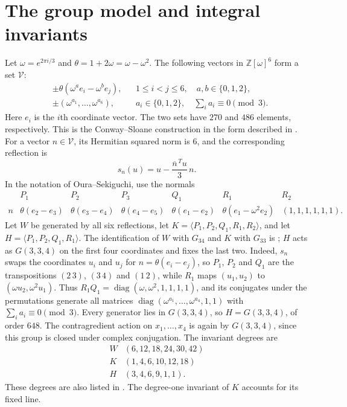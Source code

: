 \documentclass[11pt]{article}
\theoremstyle{definition}
\newcommand{\Z}{\mathbb Z}
\begin{document}
\section{The group model and integral invariants}\label{sec:model}
Let $\omega=e^{2\pi i/3}$ and
$\theta=1+2\omega=\omega-\omega^2$. The following vectors in
$\Z[\omega]^6$ form a set $\mathcal V$:
\begin{align*}
 &\pm\theta(\omega^a e_i-\omega^b e_j),
       &&1\leq i<j\leq6,\quad a,b\in\{0,1,2\},\\
 &\pm(\omega^{a_1},\ldots,\omega^{a_6}),
       &&a_i\in\{0,1,2\},\quad \sum_i a_i\equiv0\pmod3.
\end{align*}
Here $e_i$ is the $i$th coordinate vector. The two sets have $270$ and
$486$ elements, respectively. This is the Conway--Sloane construction
\cite[Theorem~10]{CS} in the form described in \cite[\S2]{OS}.
For a vector $n\in\mathcal V$, its Hermitian squared norm is $6$,
and the corresponding reflection is
\[
                   s_n(u)=u-\frac{\overline n^{\,T}u}{3}\,n.
\]
In the notation of Oura--Sekiguchi, use the normals
\[
\begin{array}{c|cccccc}
 &P_1&P_2&P_3&Q_1&R_1&R_2\\ \hline
n&\theta(e_2-e_3)&\theta(e_3-e_4)&\theta(e_4-e_5)&
\theta(e_1-e_2)&\theta(e_1-\omega^2e_2)&(1,1,1,1,1,1).
\end{array}
\]
Let $W$ be generated by all six reflections, let
$K=\langle P_1,P_2,Q_1,R_1,R_2\rangle$, and let
$H=\langle P_1,P_2,Q_1,R_1\rangle$.
The identification of $W$ with $G_{34}$ and $K$ with $G_{33}$ is
\cite[\S\S2,6.1]{OS}; $H$ acts as $G(3,3,4)$ on the first four
coordinates and fixes the last two. Indeed, $s_n$ swaps the coordinates
$u_i$ and $u_j$ for $n=\theta(e_i-e_j)$, so $P_1$, $P_2$ and $Q_1$ are the
transpositions $(2\,3)$, $(3\,4)$ and $(1\,2)$, while $R_1$ maps
$(u_1,u_2)$ to $(\omega u_2,\omega^2u_1)$. Thus
$R_1Q_1=\operatorname{diag}(\omega,\omega^2,1,1,1,1)$, and its conjugates
under the permutations generate all matrices
$\operatorname{diag}(\omega^{a_1},\ldots,\omega^{a_4},1,1)$ with
$\sum_ia_i\equiv0\pmod3$. Every generator lies in $G(3,3,4)$, so
$H=G(3,3,4)$, of order $648$. The contragredient action on
$x_1,\ldots,x_4$ is again by $G(3,3,4)$, since this group is closed under
complex conjugation. The invariant degrees are
\begin{equation}\label{eq:degrees}
\begin{array}{c|l}
 W&(6,12,18,24,30,42)\\
 K&(1,4,6,10,12,18)\\
 H&(3,4,6,9,1,1).
\end{array}
\end{equation}
These degrees are also listed in
\cite[Tables~2--3]{WachiLecture}. The degree-one invariant of $K$
accounts for its fixed line.
\end{document}
